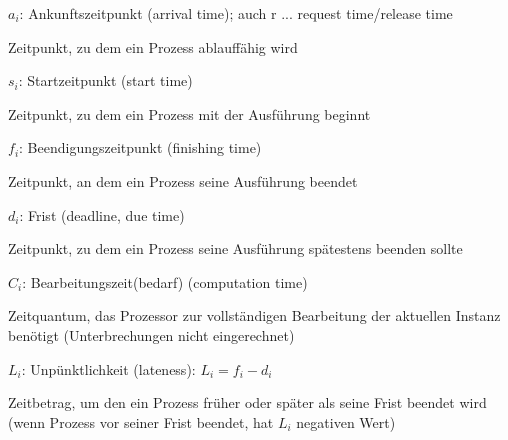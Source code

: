 \documentclass[a4paper]{article}
\begin{document}
\begin{multicols}{3}
    \begin{itemize*}
        \item
        \item
        $a_i$: Ankunftszeitpunkt (arrival time); auch r ... request
        time/release time
        \begin{itemize*}
            \item Zeitpunkt, zu dem ein Prozess ablauffähig wird
        \end{itemize*}
        \item
        $s_i$: Startzeitpunkt (start time)
        \begin{itemize*}
            \item Zeitpunkt, zu dem ein Prozess mit der Ausführung beginnt
        \end{itemize*}
        \item
        $f_i$: Beendigungszeitpunkt (finishing time)
        \begin{itemize*}
            \item Zeitpunkt, an dem ein Prozess seine Ausführung beendet
        \end{itemize*}
        \item
        $d_i$: Frist (deadline, due time)
        \begin{itemize*}
            \item Zeitpunkt, zu dem ein Prozess seine Ausführung spätestens beenden sollte
        \end{itemize*}
        \item
        $C_i$: Bearbeitungszeit(bedarf) (computation time)
        \begin{itemize*}
            \item Zeitquantum, das Prozessor zur vollständigen Bearbeitung der aktuellen Instanz benötigt (Unterbrechungen nicht eingerechnet)
        \end{itemize*}
        \item
        \item
        $L_i$: Unpünktlichkeit (lateness): $L_i= f_i - d_i$
        \begin{itemize*}
            \item Zeitbetrag, um den ein Prozess früher oder später als seine Frist beendet wird (wenn Prozess vor seiner Frist beendet, hat $L_i$ negativen Wert)

\end{itemize*}
\end{itemize*}
\end{multicols}
\end{document}
